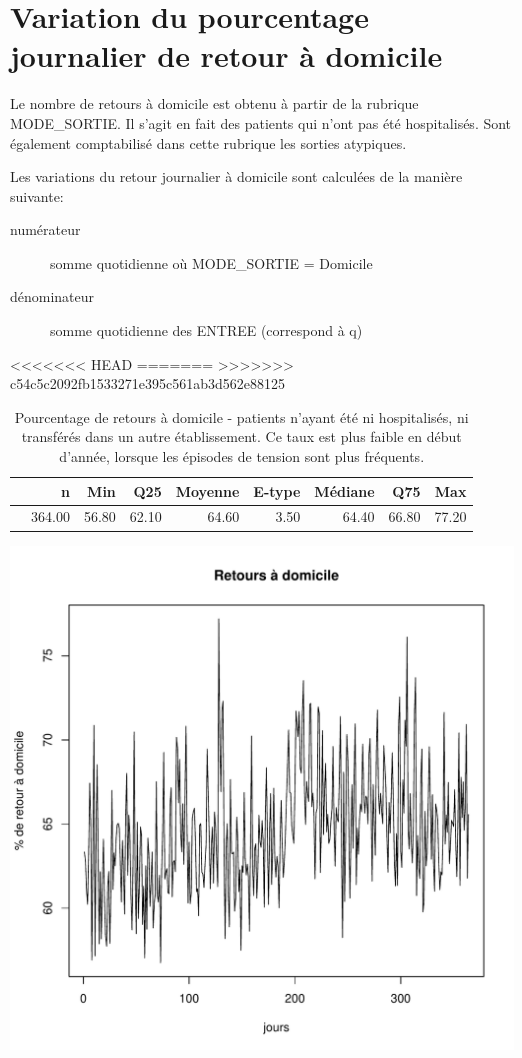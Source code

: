 \documentclass[12pt,english,french,twoside]{book}\usepackage[]{graphicx}\usepackage[]{color}
\makeatletter
\def\maxwidth{ %
  \ifdim\Gin@nat@width>\linewidth
    \linewidth
  \else
    \Gin@nat@width
  \fi
}
\makeatother
\begin{document}
\section{Variation du pourcentage journalier de retour à domicile}

Le nombre de retours à domicile est obtenu à partir de la rubrique MODE\_SORTIE. Il s'agit en fait des patients qui n'ont pas été hospitalisés. Sont également comptabilisé dans cette rubrique les sorties atypiques.

Les variations du retour journalier à domicile sont calculées de la manière suivante:
\begin{description}
  \item[numérateur] somme quotidienne où MODE\_SORTIE = Domicile
  \item[dénominateur] somme quotidienne des ENTREE (correspond à q)
\end{description}

<<<<<<< HEAD
=======
>>>>>>> c54c5c2092fb1533271e395c561ab3d562e88125
\begin{table}[ht]
\centering
\begin{tabular}{rrrrrrrrr}
  \hline
 & n & Min & Q25 & Moyenne & E-type & Médiane & Q75 & Max \\ 
  \hline
 & 364.00 & 56.80 & 62.10 & 64.60 & 3.50 & 64.40 & 66.80 & 77.20 \\ 
   \hline
\end{tabular}
\caption[Retour à domicile]{Pourcentage de retours à domicile - patients n'ayant été ni hospitalisés, ni transférés dans un autre établissement. Ce taux est plus faible en début d'année, lorsque les épisodes de tension sont plus fréquents.} 
\label{tab:rd}
\end{table}

\includegraphics[width=\maxwidth]{figure/retour_dom} 
\end{document}
